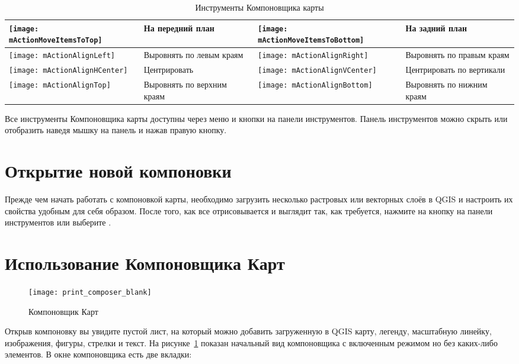\begin{table}[h]
\begin{tabular}{|m{1cm}|m{5.4cm}|m{1cm}|m{5.4cm}|}
 \hline \texttt{[image: mActionMoveItemsToTop]} & На передний
 план &
 \texttt{[image: mActionMoveItemsToBottom]} & На задний
 план \\
 \hline \texttt{[image: mActionAlignLeft]} & Выровнять по
 левым краям &
 \texttt{[image: mActionAlignRight]} & Выровнять по правым
 краям \\
 \hline \texttt{[image: mActionAlignHCenter]} & Центрировать &
 \texttt{[image: mActionAlignVCenter]} & Центрировать по
 вертикали \\
 \hline \texttt{[image: mActionAlignTop]} & Выровнять по верхним
 краям &
 \texttt{[image: mActionAlignBottom]} & Выровнять по нижним
 краям \\
\hline
\end{tabular}
\caption{Инструменты Компоновщика карты}\label{tab:printcomposer_tools}
\end{table}

Все инструменты Компоновщика карты доступны через меню и кнопки на
панели инструментов. Панель инструментов можно скрыть или отобразить
наведя мышку на панель и нажав правую кнопку.

\section{Открытие новой компоновки}\label{composertemplates}

Прежде чем начать работать с компоновкой карты, необходимо загрузить
несколько растровых или векторных слоёв в QGIS и настроить их свойства
удобным для себя образом. После того, как все отрисовывается и выглядит
так, как требуется, нажмите на кнопку
 на панели
инструментов или выберите  \arrow
{}.

\section{Использование Компоновщика Карт}\label{label_useprintcomposer}

\begin{figure}[ht]
   \centering
   \texttt{[image: print\_composer\_blank]}
   \caption{Компоновщик Карт \nixcaption}\label{fig:print_composer_blank}
\end{figure}

Открыв компоновку вы увидите пустой лист, на который можно добавить
загруженную в QGIS карту, легенду, масштабную линейку, изображения,
фигуры, стрелки и текст. На рисунке~\ref{fig:print_composer_blank}
показан начальный вид компоновщика с включенным режимом
 но без каких-либо элементов. В окне
компоновщика есть две вкладки:

